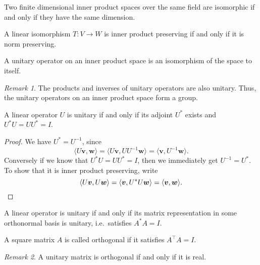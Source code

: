 \documentclass[11pt]{article}
\renewcommand{\vec}[1]{\boldsymbol{#1}}
\newcommand{\vv}{\vec{v}}
\newcommand{\vw}{\vec{w}}
\newcommand{\ip}[2]{\langle #1, #2 \rangle}
\theoremstyle{definition}
\theoremstyle{remark}
\newtheorem*{remark}{Remark}
\numberwithin{equation}{section}
\begin{document}
    \begin{corollary}
        Two finite dimensional inner product spaces over the same field are
        isomorphic if and only if they have the same dimension.
    \end{corollary}

    \begin{lemma}
        A linear isomorphism $T\colon V \to W$ is inner product preserving if and
        only if it is norm preserving.
    \end{lemma}


    \begin{definition}
        A unitary operator on an inner product space is an isomorphism of the space
        to itself.
        \begin{remark}
            The products and inverses of unitary operators are also unitary. Thus,
            the unitary operators on an inner product space form a group.
        \end{remark}
    \end{definition}

    \begin{theorem}
        A linear operator $U$ is unitary if and only if its adjoint $U^*$ exists and
        $U^*U = UU^* = I$.
    \end{theorem}
    \begin{proof}
        We have $U^* = U^{-1}$, since \[
            \ip{U\vv}{\vw} = \ip{U\vv}{UU^{-1}\vw} = \ip{\vv}{U^{-1}\vw}.
        \] Conversely if we know that $U^*U = UU^* = I$, then we immediately get
        $U^{-1} = U^*$. To show that it is inner product preserving, write \[
            \ip{U\vv}{U\vw} = \ip{\vv}{U^*U\vw} = \ip{\vv}{\vw}. \qedhere
        \] 
    \end{proof}

    \begin{theorem}
        A linear operator is unitary if and only if its matrix representation in some
        orthonormal basis is unitary, i.e.\ satisfies $A^*A = I$.
    \end{theorem}

    \begin{definition}
        A square matrix $A$ is called orthogonal if  it satisfies $A^\top A = I$.
        \begin{remark}
            A unitary matrix is orthogonal if and only if it is real.
        \end{remark}
    \end{definition}
\end{document}
